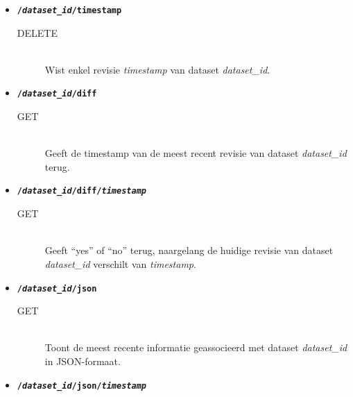 \documentclass[a4paper]{article}
\begin{document}
\begin{itemize}
  \item {\tt\large\bf /{\it dataset\_id}/timestamp}
    \begin{description}
      \item[DELETE] \hfill \\
        Wist enkel revisie {\it timestamp} van dataset {\it dataset\_id}.
    \end{description}
  \item {\tt\large\bf /{\it dataset\_id}/diff}
    \begin{description}
      \item[GET] \hfill \\
        Geeft de timestamp van de meest recent revisie van dataset
        {\it dataset\_id} terug.
    \end{description}
  \item {\tt\large\bf /{\it dataset\_id}/diff/{\it timestamp}}
    \begin{description}
      \item[GET] \hfill \\
        Geeft ``yes'' of ``no'' terug, naargelang de huidige revisie van
        dataset {\it dataset\_id} verschilt van {\it timestamp}.
    \end{description}
  \item {\tt\large\bf /{\it dataset\_id}/json}
    \begin{description}
      \item[GET] \hfill \\
        Toont de meest recente informatie geassocieerd met dataset
        {\it dataset\_id} in JSON-formaat.
    \end{description}
  \item {\tt\large\bf /{\it dataset\_id}/json/{\it timestamp}}

\end{itemize}
\end{document}
